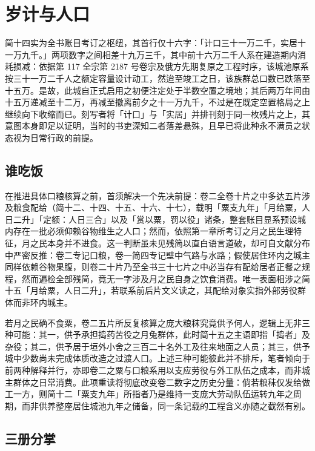 \chapter{岁计与人口}

简十四实为全书账目考订之枢纽，其首行仅十六字：「计口三十一万二千，实居十一万九千。」两项数字之间相差十九万三千，其中前十六万二千人系在建造期内消耗损减：依据第 117 全宗第 2187 号卷宗及俄方先期复原之工程时序，该城池原系按三十一万二千人之额定容量设计动工，然迨至竣工之日，该族群总口数已跌落至十五万。是故，此城自正式启用之初便注定处于半数空置之境地；其后两万年间由十五万递减至十二万，再减至撤离前夕之十一万九千，不过是在既定空置格局之上继续向下收缩而已。刻写者将「计口」与「实居」并排刊刻于同一枚残片之上，其意图本身即足以证明，当时的书吏深知二者落差悬殊，且早已将此种永不满员之状态视为日常行政的前提。

\section{谁吃饭}

在推进具体口粮核算之前，首须解决一个先决前提：卷二全卷十片之中多达五片涉及粮食配给（简十二、十四、十五、十六、十七），载明「粟支九年」「月给粟，人日二升」「定额：人日三合」以及「赏以粟，罚以役」诸条，整套账目显系预设城内存在一批必须仰赖谷物维生之人口；然而，依照第一章所考订之月之民生理特征，月之民本身并不进食。这一判断虽未见残简以直白语言道破，却可自文献分布中严密反推：卷二专记口粮，卷一简四专记壁中气路与水路；假使居住环内之城主同样依赖谷物果腹，则卷二十片乃至全书三十七片之中必当存有配给居者正餐之规程，然而遍检全部残简，竟无一字涉及月之民自身之饮食消费。唯一表面相涉之简十五「月给粟，人日二升」，若联系前后片文义读之，其配给对象实指外部劳役群体而非环内城主。

若月之民确不食粟，卷二五片所反复核算之庞大粮秣究竟供予何人，逻辑上无非三种可能：其一，供予承担捣药苦役之月兔群体，此时简十五之主语即指「捣者」及杂役；其二，供予居于垣外小舍之三百二十名外工及往来地面之人员；其三，供予城中少数尚未完成体质改造之过渡人口。上述三种可能彼此并不排斥，笔者倾向于前两种解释并行，亦即卷二之粟与口粮系用以支应劳役与外工队伍之成本，而非城主群体之日常消费。此项重读将彻底改变卷二数字之历史分量：倘若粮秣仅发给做工一方，则简十二「粟支九年」所指者乃是维持一支庞大劳动队伍运转九年之周期，而非供养整座居住城池九年之储备，同一条记载的工程含义亦随之截然有别。

\section{三册分掌}

